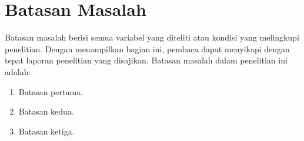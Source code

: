 \section{Batasan Masalah}

Batasan masalah berisi semua variabel yang diteliti atau kondisi yang melingkupi penelitian. Dengan menampilkan bagian ini, pembaca dapat menyikapi dengan tepat laporan penelitian yang disajikan. Batasan masalah dalam penelitian ini adalah:

\begin{enumerate}
    \item Batasan pertama.
    \item Batasan kedua.
    \item Batasan ketiga.
\end{enumerate}
